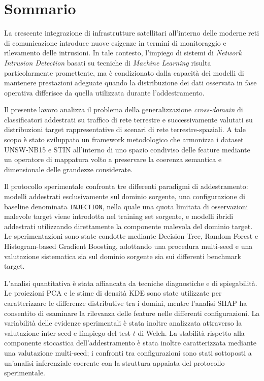 \chapter*{Sommario}

La crescente integrazione di infrastrutture satellitari all'interno delle moderne reti di comunicazione introduce nuove esigenze in termini di monitoraggio e rilevamento delle intrusioni. 
In tale contesto, l'impiego di sistemi di \textit{Network Intrusion Detection} basati su tecniche di \textit{Machine Learning} risulta particolarmente promettente, ma è condizionato dalla capacità dei modelli di mantenere prestazioni adeguate quando la distribuzione dei dati osservata in fase operativa differisce da quella utilizzata durante l'addestramento.

Il presente lavoro analizza il problema della generalizzazione \textit{cross-domain} di classificatori addestrati su traffico di rete terrestre e successivamente valutati su distribuzioni target rappresentative di scenari di rete terrestre-spaziali.
A tale scopo è stato sviluppato un framework metodologico che armonizza i dataset UNSW-NB15 e STIN all'interno di uno spazio condiviso delle feature mediante un operatore di mappatura volto a preservare la coerenza semantica e dimensionale delle grandezze considerate.

Il protocollo sperimentale confronta tre differenti paradigmi di addestramento: modelli addestrati esclusivamente sul dominio sorgente, una configurazione di baseline denominata \texttt{INJECTION}, nella quale una quota limitata di osservazioni malevole target viene introdotta nel training set sorgente, e modelli ibridi addestrati utilizzando direttamente la componente malevola del dominio target. 
Le sperimentazioni sono state condotte mediante Decision Tree, Random Forest e Histogram-based Gradient Boosting, adottando una procedura multi-seed e una valutazione sistematica sia sul dominio sorgente sia sui differenti benchmark target.

L'analisi quantitativa è stata affiancata da tecniche diagnostiche e di spiegabilità. 
Le proiezioni PCA e le stime di densità KDE sono state utilizzate per caratterizzare le differenze distributive tra i domini, mentre l'analisi SHAP ha consentito di esaminare la rilevanza delle feature nelle differenti configurazioni. 
La variabilità delle evidenze sperimentali è stata inoltre analizzata attraverso la valutazione inter-seed e l\'impiego del test $t$ di Welch.
La stabilità rispetto alla componente stocastica dell'addestramento è stata inoltre caratterizzata mediante una valutazione multi-seed; i confronti tra configurazioni sono stati sottoposti a un'analisi inferenziale coerente con la struttura appaiata del protocollo sperimentale.

